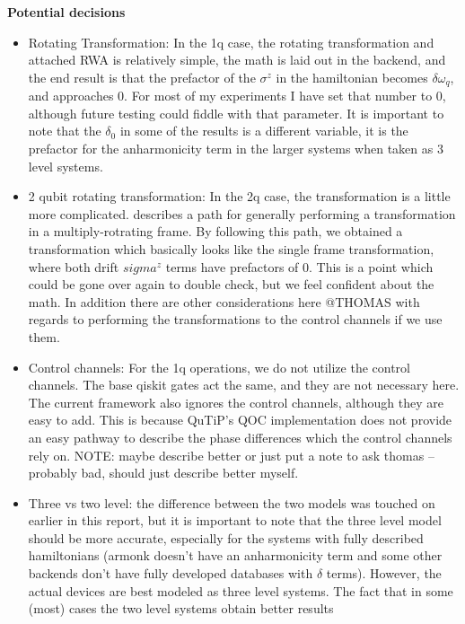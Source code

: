 \documentclass[12pt]{article}
\begin{document}
    \textbf{Potential decisions}
\begin{itemize}
    \item Rotating Transformation: In the 1q case, the rotating transformation
    and attached RWA is relatively simple, the math is laid out in the backend,
    and the end result is that the prefactor of the $\sigma^z$ in the
    hamiltonian becomes $\delta \omega_{q}$, and approaches 0. For most of my
    experiments I have set that number to 0, although future testing could
    fiddle with that parameter. It is important to note that the $\delta_0$ in
    some of the results is a different variable, it is the prefactor for the
    anharmonicity term in the larger systems when taken as 3 level systems.
    \item 2 qubit rotating transformation: In the 2q case, the transformation is
    a little more complicated. \cite{fisher_optimal_nodate} describes a path for
    generally performing a transformation in a multiply-rotrating frame. By
    following this path, we obtained a transformation which basically looks like
    the single frame transformation, where both drift $sigma^z$ terms have
    prefactors of 0. This is a point which could be gone over again to double
    check, but we feel confident about the math. In addition there are other
    considerations here @THOMAS with regards to performing the transformations
    to the control channels if we use them.
    \item Control channels: For the 1q operations, we do not utilize the control
    channels. The base qiskit gates act the same, and they are not necessary
    here. The current framework also ignores the control channels, although they
    are easy to add. This is because QuTiP's QOC implementation does not provide
    an easy pathway to describe the phase differences which the control channels
    rely on. NOTE: maybe describe better or just put a note to ask thomas --
    probably bad, should just describe better myself.
    \item Three vs two level: the difference between the two models was touched
    on earlier in this report, but it is important to note that the three level
    model should be more accurate, especially for the systems with fully
    described hamiltonians (armonk doesn't have an anharmonicity term and some
    other backends don't have fully developed databases with $\delta$ terms).
    However, the actual devices are best modeled as three level systems. The
    fact that in some (most) cases the two level systems obtain better results

\end{itemize}
\end{document}
